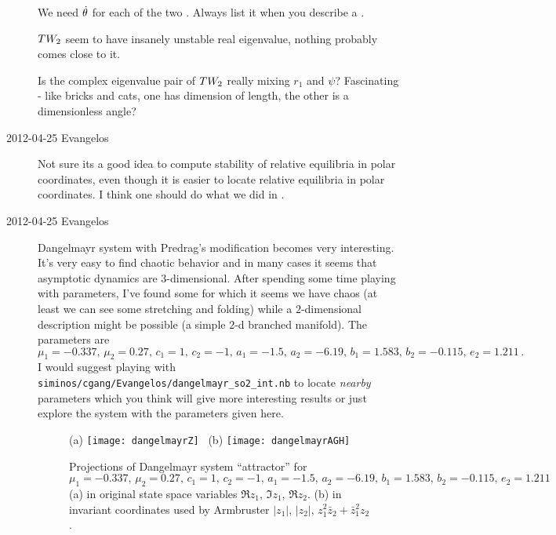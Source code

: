 \begin{description}
We need $\dot{\theta}$ for each of the two \reqva. Always list it when
you describe a \reqv.

$TW_{2}$ seem to have insanely unstable real
eigenvalue, nothing probably comes close to it.

Is the complex eigenvalue pair of $TW_{2}$ really mixing $r_1$ and $\psi$?
Fascinating - like bricks and cats, one has dimension of length, the other is
a dimensionless angle?

\item[2012-04-25 Evangelos] Not sure its a good idea to compute stability
of relative equilibria in polar coordinates, even though it is easier to locate
relative equilibria in polar coordinates. I think one should do what we did
in .

\item[2012-04-25 Evangelos] Dangelmayr system with Predrag's modification
becomes very interesting. It's very easy to find chaotic behavior and in many
cases it seems that asymptotic dynamics are $3$-dimensional.
After spending some time playing with parameters, I've found some
for which it seems we have chaos (at least we can see some stretching
and folding) while a $2$-dimensional description might be possible
(a simple $2$-d branched manifold).
The parameters are
\[
 \mu_1 = -0.337,\, \mu_2 = 0.27,\, c_1 = 1,\, c_2 = -1,\, a_1 = -1.5,\,
 a_2 = -6.19,\, b_1 = 1.583,\,  b_2 = -0.115,\, e_2 = 1.211\,.
\]
I would suggest playing with \texttt{siminos/cgang/Evangelos/dangelmayr\_so2\_int.nb}
to locate \emph{nearby} parameters which you think will give more interesting
results or just explore the system with the parameters given here.

 \begin{figure}
\centering
 (a) \texttt{[image: dangelmayrZ]}~
 (b) \texttt{[image: dangelmayrAGH]}~
\caption{Projections of Dangelmayr system 
``attractor'' for $\mu_1 = -0.337,\, \mu_2 = 0.27,\, c_1 = 1,\, c_2 =
-1,\, a_1 = -1.5,\, a_2 = -6.19,\, b_1 = 1.583,\,  b_2 = -0.115,\, e_2 =
1.211$
(a) in original state space variables $\Re z_1,\,\Im z_1,\,\Re z_2$.
(b) in invariant coordinates used by
Armbruster \etal{} $|z_1|,\, |z_2|,\, z_1^2 \bar{z}_2 + \bar{z}_1^2 z_2$.
}
 \label{fig:dangelmayrChaos}
\end{figure}


\end{description}
